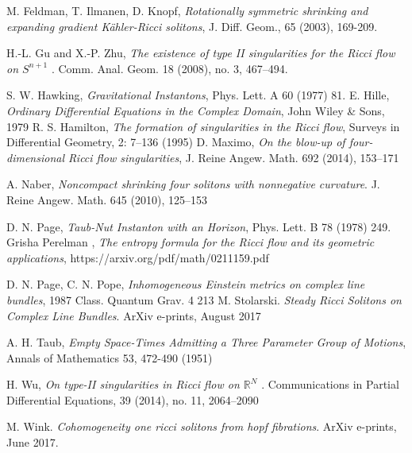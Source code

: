 \documentclass{amsart}
\theoremstyle{definition}
\theoremstyle{remark}
\numberwithin{equation}{section}
\newcommand{\R}{\mathbb{R}}  %
\begin{document}
\begin{thebibliography}{9}
 M. Feldman, T. Ilmanen, D. Knopf, \emph{Rotationally symmetric shrinking and expanding
gradient K\"ahler-Ricci solitons}, J. Diff. Geom., 65 (2003), 169-209.

 H.-L. Gu and X.-P. Zhu, \emph{The existence of type II singularities for the Ricci flow on
$S^{n+1}$} . Comm. Anal. Geom. 18 (2008), no. 3, 467–494.

 S. W. Hawking, \emph{Gravitational Instantons}, Phys. Lett. A 60 (1977) 81.
E. Hille, \emph{Ordinary Differential Equations in the Complex Domain}, John Wiley \& Sons, 1979
 R. S. Hamilton, \emph{The formation of singularities in the Ricci flow}, Surveys in Differential Geometry, 2: 7–136 (1995)
 D. Maximo, \emph{On the blow-up of four-dimensional Ricci flow singularities}, J. Reine Angew. Math. 692 (2014), 153–171

 A. Naber, \emph{Noncompact shrinking four solitons with nonnegative curvature}. J. Reine
Angew. Math. 645 (2010), 125–153

 D. N. Page, \emph{Taub-Nut Instanton with an Horizon}, Phys. Lett. B 78 (1978) 249.
 Grisha Perelman , \emph{The entropy formula for the Ricci flow and its geometric applications}, https://arxiv.org/pdf/math/0211159.pdf

 D. N. Page, C. N. Pope, \emph{Inhomogeneous Einstein metrics on complex line bundles}, 1987 Class. Quantum Grav. 4 213
 M. Stolarski. \emph{Steady Ricci Solitons on Complex Line Bundles}. ArXiv e-prints, August 2017

 A. H. Taub, \emph{Empty Space-Times Admitting a Three Parameter Group of Motions}, Annals of Mathematics 53, 472-490 (1951)

 H. Wu, \emph{On type-II singularities in Ricci flow on $\R^{N}$
}. Communications in Partial Differential Equations,
39 (2014), no. 11, 2064–2090

 M. Wink. \emph{Cohomogeneity one ricci solitons from hopf fibrations}. ArXiv e-prints, June
2017.








\end{thebibliography}
\end{document}
